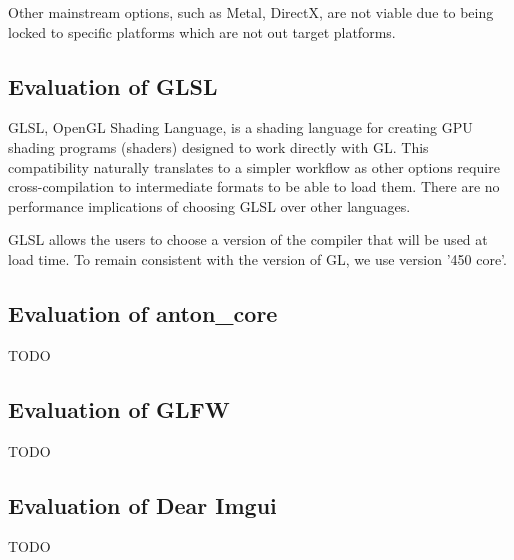 \documentclass[12pt, a4paper]{article}
\begin{document}
Other mainstream options, such as Metal, DirectX, are not viable due to being locked to specific
platforms which are not out target platforms.

\subsection{Evaluation of GLSL}
GLSL, OpenGL Shading Language, is a shading language for creating GPU shading programs (shaders)
designed to work directly with GL. This compatibility naturally translates to a simpler workflow as
other options require cross-compilation to intermediate formats to be able to load them. There are
no performance implications of choosing GLSL over other languages.

GLSL allows the users to choose a version of the compiler that will be used at load time. To remain
consistent with the version of GL, we use version '450 core'.

\subsection{Evaluation of anton{\_}core}
TODO

\subsection{Evaluation of GLFW}
TODO

\subsection{Evaluation of Dear Imgui}
TODO
\end{document}

